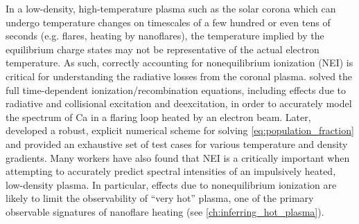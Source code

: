 In a low-density, high-temperature plasma such as the solar corona which can undergo temperature changes on timescales of a few hundred or even tens of seconds (e.g. flares, heating by nanoflares), the temperature implied by the equilibrium charge states may not be representative of the actual electron temperature. As such, correctly accounting for nonequilibrium ionization (NEI) is critical for understanding the radiative losses from the coronal plasma. \citet{macneice_numerical_1984} solved the full time-dependent ionization/recombination equations, including effects due to radiative and collisional excitation and deexcitation, in order to accurately model the spectrum of Ca in a flaring loop heated by an electron beam. Later, \citet{bradshaw_numerical_2009} developed a robust, explicit numerical scheme for solving \autoref{eq:population_fraction} and provided an exhaustive set of test cases for various temperature and density gradients. Many workers \citep[e.g.][]{hansteen_new_1993,reale_nonequilibrium_2008,bradshaw_radiative_2003,bradshaw_explosive_2006,bradshaw_what_2011,bradshaw_quantifying_2019} have also found that NEI is a critically important when attempting to accurately predict spectral intensities of an impulsively heated, low-density plasma. In particular, effects due to nonequilibrium ionization are likely to limit the observability of ``very hot'' plasma, one of the primary observable signatures of nanoflare heating (see \autoref{ch:inferring_hot_plasma}).

